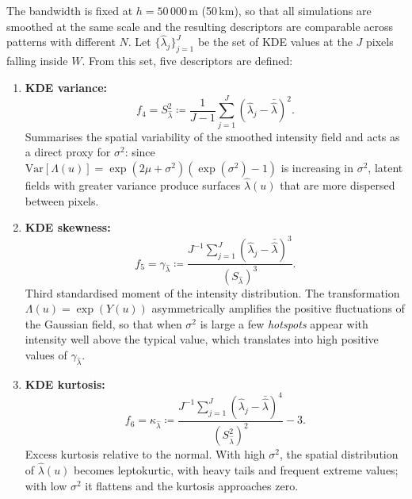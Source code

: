 \documentclass[a4paper,fleqn]{cas-sc}
\numberwithin{equation}{section}
\begin{document}
The bandwidth is fixed at $h=50\,000$\,m (50\,km), so that all
simulations are smoothed at the same scale and the resulting
descriptors are comparable across patterns with different $N$. Let
$\{\hat{\lambda}_j\}_{j=1}^{J}$ be the set of KDE values at the $J$
pixels falling inside $W$. From this set, five descriptors are
defined:
\begin{enumerate}[label=(\roman*),leftmargin=*,itemsep=0.6em]
\item \textbf{KDE variance:}
\begin{equation}
f_4 = S_{\hat{\lambda}}^2 \coloneqq
    \frac{1}{J-1}\sum_{j=1}^{J}(\hat{\lambda}_j - \bar{\hat{\lambda}})^2.
\label{eq:f4_var_kde}
\end{equation}
Summarises the spatial variability of the smoothed intensity field and
acts as a direct proxy for $\sigma^2$: since
$\mathrm{Var}[\Lambda(u)]=\exp(2\mu+\sigma^2)(\exp(\sigma^2)-1)$ is
increasing in $\sigma^2$, latent fields with greater variance produce
surfaces $\hat{\lambda}(u)$ that are more dispersed between pixels.

\item \textbf{KDE skewness:}
\begin{equation}
f_5 = \gamma_{\hat{\lambda}} \coloneqq
    \frac{J^{-1}\sum_{j=1}^{J}(\hat{\lambda}_j -
    \bar{\hat{\lambda}})^3}{(S_{\hat{\lambda}})^3}.
\label{eq:f5_skew}
\end{equation}
Third standardised moment of the intensity distribution. The
transformation $\Lambda(u)=\exp(Y(u))$ asymmetrically amplifies the
positive fluctuations of the Gaussian field, so that when $\sigma^2$
is large a few \emph{hotspots} appear with intensity well above the
typical value, which translates into high positive values of
$\gamma_{\hat{\lambda}}$.

\item \textbf{KDE kurtosis:}
\begin{equation}
f_6 = \kappa_{\hat{\lambda}} \coloneqq
    \frac{J^{-1}\sum_{j=1}^{J}(\hat{\lambda}_j -
    \bar{\hat{\lambda}})^4}{(S_{\hat{\lambda}}^2)^2} - 3.
\label{eq:f6_kurt}
\end{equation}
Excess kurtosis relative to the normal. With high $\sigma^2$, the
spatial distribution of $\hat{\lambda}(u)$ becomes leptokurtic, with
heavy tails and frequent extreme values; with low $\sigma^2$ it
flattens and the kurtosis approaches zero.


\end{enumerate}
\end{document}
